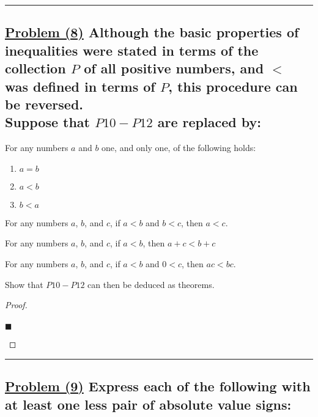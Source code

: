 \documentclass[letterpaper, 10 pt, conference]{ieeeconf}  %
\begin{document}
\noindent\rule{8cm}{0.4pt}
\subsection{\textbf{\underline{Problem (8)} Although the basic properties of inequalities were stated in terms of the collection $P$ of all positive numbers, and $<$ was defined in terms of $P$, this procedure can be reversed. \\ Suppose that $P10 - P12$ are replaced by:}}

\begin{description}[align=left,labelwidth=3cm]
\item [P\prime10] For any numbers $a$ and $b$ one, and only one, of the following holds: 
    \begin{enumerate}
        \item $a = b$
        \item $a < b$
        \item $b < a$
    \end{enumerate}
\item [P\prime11] For any numbers $a$, $b$, and $c$, if $a < b$ and $b < c$, then $a < c$.
\item [P\prime12] For any numbers $a$, $b$, and $c$, if $a < b$, then $a + c < b + c$
\item [P\prime13] For any numbers $a$, $b$, and $c$, if $a < b$ and $0 < c$, then $ac < bc$.
\end{description}
Show that $P10-P12$ can then be deduced as theorems.

\begin{proof}
\begin{align}
    
\end{align}
\begin{flushright}
$\blacksquare$
\end{flushright}
\end{proof}


\noindent\rule{8cm}{0.4pt}
\subsection{\textbf{\underline{Problem (9)} Express each of the following with at least one less pair of absolute value signs:}}
\end{document}
